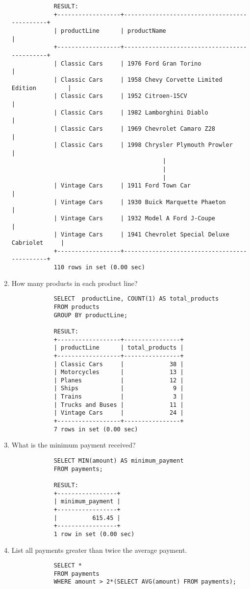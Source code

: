 \documentclass{article}
\begin{document}
\begin{enumerate}
\begin{verbatim}
			RESULT:
			+------------------+---------------------------------------------+
			| productLine      | productName                                 |
			+------------------+---------------------------------------------+
			| Classic Cars     | 1976 Ford Gran Torino                       |
			| Classic Cars     | 1958 Chevy Corvette Limited Edition         |
			| Classic Cars     | 1952 Citroen-15CV                           |
			| Classic Cars     | 1982 Lamborghini Diablo                     |
			| Classic Cars     | 1969 Chevrolet Camaro Z28                   |
			| Classic Cars     | 1998 Chrysler Plymouth Prowler              |
			                               |
			                               |
			                               |
			| Vintage Cars     | 1911 Ford Town Car                          |
			| Vintage Cars     | 1930 Buick Marquette Phaeton                |
			| Vintage Cars     | 1932 Model A Ford J-Coupe                   |
			| Vintage Cars     | 1941 Chevrolet Special Deluxe Cabriolet     |
			+------------------+---------------------------------------------+
			110 rows in set (0.00 sec)
			\end{verbatim}
		\item How many products in each product line?
			\begin{verbatim}
			SELECT  productLine, COUNT(1) AS total_products
			FROM products
			GROUP BY productLine;
			
			RESULT:
			+------------------+----------------+
			| productLine      | total_products |
			+------------------+----------------+
			| Classic Cars     |             38 |
			| Motorcycles      |             13 |
			| Planes           |             12 |
			| Ships            |              9 |
			| Trains           |              3 |
			| Trucks and Buses |             11 |
			| Vintage Cars     |             24 |
			+------------------+----------------+
			7 rows in set (0.00 sec)
			\end{verbatim}
		\item What is the minimum payment received?
			\begin{verbatim}
			SELECT MIN(amount) AS minimum_payment
			FROM payments;
			
			RESULT:
			+-----------------+
			| minimum_payment |
			+-----------------+
			|          615.45 |
			+-----------------+
			1 row in set (0.00 sec)
			\end{verbatim}
		\item List all payments greater than twice the average payment.
			\begin{verbatim}
			SELECT *
			FROM payments
			WHERE amount > 2*(SELECT AVG(amount) FROM payments);
			

\end{verbatim}
\end{enumerate}
\end{document}
